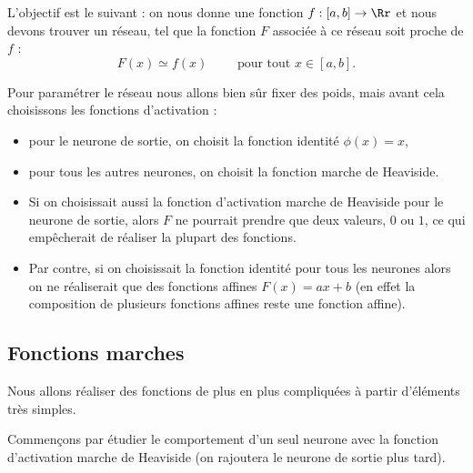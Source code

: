\documentclass[11pt,class=report,crop=false]{standalone}
\begin{document}
L'objectif est le suivant : on nous donne une fonction $f : [a,b] \to \Rr$ et nous devons trouver un réseau, tel que la fonction $F$ associée à ce réseau soit proche de $f$ :
$$F(x) \simeq f(x) \qquad \text{ pour tout } x \in [a,b].$$

Pour paramétrer le réseau nous allons bien sûr fixer des poids, mais avant cela choisissons les fonctions d'activation :
\begin{itemize}
  \item pour le neurone de sortie, on choisit la fonction identité $\phi(x)=x$,
  \item pour tous les autres neurones, on choisit la fonction marche de Heaviside.
\end{itemize}


\begin{remarque*}
\sauteligne
\begin{itemize}
  \item Si on choisissait aussi la fonction d'activation marche de Heaviside pour le neurone de sortie, alors $F$ ne pourrait prendre que deux valeurs, $0$ ou $1$, ce qui empêcherait de réaliser la plupart des fonctions.
  
  \item Par contre, si on choisissait la fonction identité pour tous les neurones alors on ne réaliserait que des fonctions affines $F(x)=ax+b$ (en effet la composition de plusieurs fonctions affines reste une fonction affine). 

\end{itemize}
\end{remarque*}

\subsection{Fonctions marches}
\label{ssec:marches}

Nous allons réaliser des fonctions de plus en plus compliquées à partir d'éléments très simples.


Commençons par étudier le comportement d'un seul neurone avec la fonction d'activation marche de Heaviside (on rajoutera le neurone de sortie plus tard).
\end{document}
